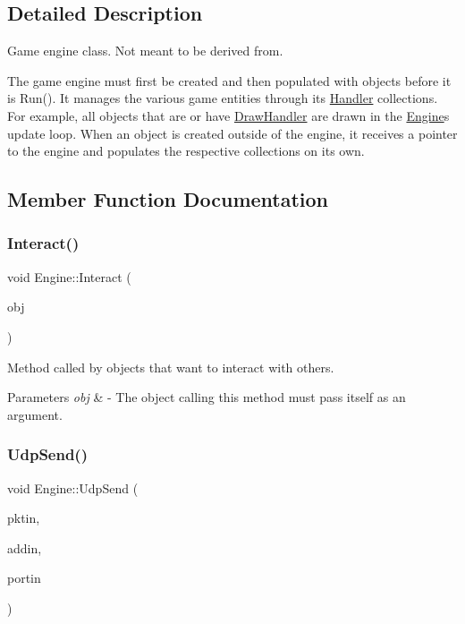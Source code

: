 \subsection{Detailed Description}
Game engine class. Not meant to be derived from. 

The game engine must first be created and then populated with objects before it is Run(). It manages the various game entities through its \hyperlink{class_handler}{Handler} collections. For example, all objects that are or have \hyperlink{class_draw_handler}{Draw\+Handler} are drawn in the \hyperlink{class_engine}{Engine}\textquotesingle{}s update loop. When an object is created outside of the engine, it receives a pointer to the engine and populates the respective collections on its own. 

\subsection{Member Function Documentation}
\hypertarget{class_engine_a696e2de094fad8a043c105536a84754e}{}\label{class_engine_a696e2de094fad8a043c105536a84754e} 
\subsubsection{\texorpdfstring{Interact()}{Interact()}}
{\footnotesize\ttfamily void Engine\+::\+Interact (\begin{DoxyParamCaption}\item[{class \hyperlink{class_scr_object}{Scr\+Object} $\ast$}]{obj }\end{DoxyParamCaption})}



Method called by objects that want to interact with others. 


\begin{DoxyParams}{Parameters}
{\em obj} & -\/ The object calling this method must pass itself as an argument. \\
\hline
\end{DoxyParams}
\hypertarget{class_engine_a6636f2c1160776ebdcb1a07159c15e4a}{}\label{class_engine_a6636f2c1160776ebdcb1a07159c15e4a} 
\subsubsection{\texorpdfstring{Udp\+Send()}{UdpSend()}}
{\footnotesize\ttfamily void Engine\+::\+Udp\+Send (\begin{DoxyParamCaption}\item[{\hyperlink{class_packet}{Packet} $\ast$}]{pktin,  }\item[{\hyperlink{class_i_padd}{I\+Padd}}]{addin,  }\item[{unsigned short}]{portin }\end{DoxyParamCaption})}



